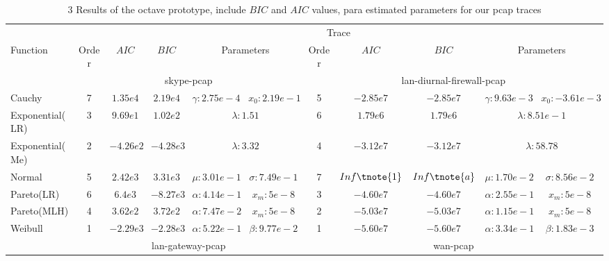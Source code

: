 \begin{table}
    \centering
    \caption{3 Results of the octave prototype, include $BIC$ and $AIC$ values, para estimated parameters for our pcap traces}
        \begin{threeparttable}[t]
        \begin{tabular}{lcccccccccc}
            \hline
            & \multicolumn{10}{c}{Trace} \\ \cline{2-11} 
            Function        & Order & $AIC$  & $BIC$  & \multicolumn{2}{c}{Parameters}  
            & Order & $AIC$ & $BIC$  & \multicolumn{2}{c}{Parameters} \\ \hline 
            
            & \multicolumn{5}{c}{skype-pcap}  & \multicolumn{5}{c}{lan-diurnal-firewall-pcap}   \\ \hline 
            Cauchy          &    7 & $1.35e4$    & $2.19e4$    & $\gamma:2.75e-4$ & $x_0:2.19e-1$    
            &    5 & $-2.85e7$   & $-2.85e7$   & $\gamma:9.63e-3$ & $x_0:-3.61e-3$    \\
            Exponential(LR) &    3 & $9.69e1$   & $1.02e2$   & \multicolumn{2}{c}{$\lambda:1.51$}   
            &    6 & $1.79e6$    & $1.79e6$    & \multicolumn{2}{c}{$\lambda:8.51e-1$}    \\
            Exponential(Me) &    2 & $-4.26e2$   & $-4.28e3$   & \multicolumn{2}{c}{$\lambda:3.32$}   
            &    4 & $-3.12e7$   & $-3.12e7$   & \multicolumn{2}{c}{$ \lambda:58.78$} \\
            Normal          &    5 & $2.42e3$    & $3.31e3$    & $\mu:3.01e-1 $    & $\sigma:7.49e-1$ 
            &    7 & $Inf \tnote{1}$       & $Inf \tnote{a}$       & $\mu:1.70e-2$     & $\sigma:8.56e-2$ \\
            Pareto(LR)      &    6 & $6.4e3$   & $-8.27e3$   & $\alpha:4.14e-1$ & $x_m:5e-8$    
            &    3 & $-4.60e7$   & $-4.60e7$   & $\alpha:2.55e-1$ & $ x_m:5e-8$    \\
            Pareto(MLH)     &    4 & $3.62e2$   & $3.72e2$   & $\alpha:7.47e-2$ & $x_m:5e-8$    
            &    2 & $-5.03e7$   & $-5.03e7$   & $\alpha:1.15e-1$ & $ x_m:5e-8$    \\
            Weibull         &    1 & $-2.29e3$   & $-2.28e3$  & $\alpha:5.22e-1$ & $\beta:9.77e-2$  
            &    1 & $-5.60e7$   & $-5.60e7$   & $\alpha:3.34e-1$ & $\beta:1.83e-3$  \\ \hline    
            & \multicolumn{5}{c}{lan-gateway-pcap} & \multicolumn{5}{c}{wan-pcap}  \\ \hline

\end{tabular}
\end{threeparttable}
\end{table}
